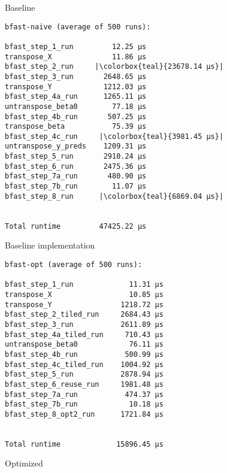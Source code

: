 \begin{frame}[fragile]{Baseline}
%

\begin{minipage}{.5\textwidth}
    \begin{verbatim}
bfast-naive (average of 500 runs):

bfast_step_1_run         12.25 µs
transpose_X              11.86 µs
bfast_step_2_run     |\colorbox{teal}{23678.14 µs}|
bfast_step_3_run       2648.65 µs
transpose_Y            1212.03 µs
bfast_step_4a_run      1265.11 µs
untranspose_beta0        77.18 µs
bfast_step_4b_run       507.25 µs
transpose_beta           75.39 µs
bfast_step_4c_run     |\colorbox{teal}{3981.45 µs}|
untranspose_y_preds    1209.31 µs
bfast_step_5_run       2910.24 µs
bfast_step_6_run       2475.36 µs
bfast_step_7a_run       480.90 µs
bfast_step_7b_run        11.07 µs
bfast_step_8_run      |\colorbox{teal}{6869.04 µs}|


Total runtime         47425.22 µs
\end{verbatim}
\begin{center}
Baseline implementation
\end{center}
\end{minipage}%
%
\begin{minipage}{.55\textwidth}
%
%
%
%
%
%
\begin{verbatim}
bfast-opt (average of 500 runs):

bfast_step_1_run             11.31 µs
transpose_X                  10.85 µs
transpose_Y                1218.72 µs
bfast_step_2_tiled_run     2684.43 µs
bfast_step_3_run           2611.89 µs
bfast_step_4a_tiled_run     710.43 µs
untranspose_beta0            76.11 µs
bfast_step_4b_run           500.99 µs
bfast_step_4c_tiled_run    1004.92 µs
bfast_step_5_run           2878.94 µs
bfast_step_6_reuse_run     1981.48 µs
bfast_step_7a_run           474.37 µs
bfast_step_7b_run            10.18 µs
bfast_step_8_opt2_run      1721.84 µs


Total runtime             15896.45 µs
\end{verbatim}
\begin{center}
Optimized
\end{center}
%
%
\end{minipage}
%
%
%


\end{frame}
